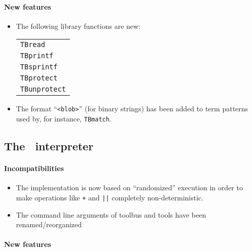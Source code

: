 \documentclass[a4,twoside,noweb]{article} %
\begin{document}
\paragraph{New features}

\begin{itemize}
\item The following library functions are new:
\begin{tabular}{l}
        {\tt TBread}\\
        {\tt TBprintf}\\
        {\tt TBsprintf}\\
        {\tt TBprotect}\\
        {\tt TBunprotect}
\end{tabular}
\item The format ``\verb+<blob>+'' (for binary strings) has been added to term patterns 
  used by, for instance, {\tt TBmatch}.

\end{itemize}

\subsection{The \TB\ interpreter}

\paragraph{Incompatibilities}

\begin{itemize}

\item The implementation is now based on ``randomized'' execution
in order to make operations like {\tt +} and {\tt ||}
completely non-deterministic.
\item The command line arguments of toolbus and tools have been
  renamed/reorganized

\end{itemize}

\paragraph{New features}
\end{document}

